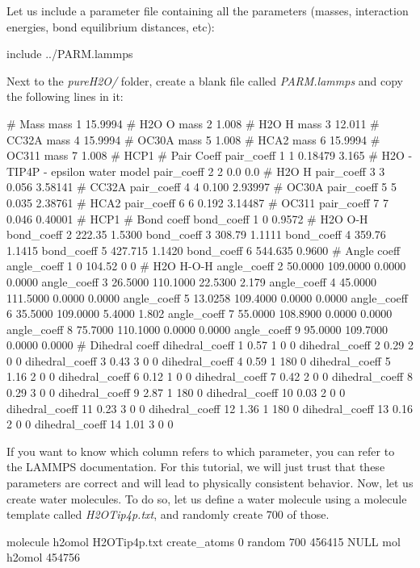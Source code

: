 Let us include a parameter file containing all the
parameters (masses, interaction energies, bond equilibrium
distances, etc):

\begin{lcverbatim}
include ../PARM.lammps
\end{lcverbatim}

\noindent Next to the \textit{pureH2O/} folder, create a blank file called
\textit{PARM.lammps} and copy the following lines in it:

\begin{lcverbatim}
# Mass
mass 1 15.9994 # H2O O
mass 2 1.008 # H2O H
mass 3 12.011 # CC32A
mass 4 15.9994 # OC30A
mass 5 1.008 # HCA2
mass 6 15.9994 # OC311
mass 7 1.008 # HCP1
# Pair Coeff
pair_coeff 1 1 0.18479 3.165 # H2O - TIP4P - epsilon water model
pair_coeff 2 2 0.0 0.0 # H2O H
pair_coeff 3 3 0.056 3.58141 # CC32A
pair_coeff 4 4 0.100 2.93997 # OC30A
pair_coeff 5 5 0.035 2.38761 # HCA2
pair_coeff 6 6 0.192 3.14487 # OC311
pair_coeff 7 7 0.046 0.40001 # HCP1
# Bond coeff
bond_coeff 1 0 0.9572 # H2O O-H
bond_coeff 2 222.35 1.5300
bond_coeff 3 308.79 1.1111
bond_coeff 4 359.76 1.1415
bond_coeff 5 427.715 1.1420
bond_coeff 6 544.635 0.9600
# Angle coeff
angle_coeff 1 0 104.52 0 0 # H2O H-O-H
angle_coeff 2 50.0000 109.0000 0.0000 0.0000
angle_coeff 3 26.5000 110.1000 22.5300 2.179   
angle_coeff 4 45.0000 111.5000 0.0000 0.0000 
angle_coeff 5 13.0258 109.4000 0.0000 0.0000
angle_coeff 6 35.5000 109.0000 5.4000 1.802
angle_coeff 7 55.0000 108.8900 0.0000 0.0000
angle_coeff 8 75.7000 110.1000 0.0000 0.0000
angle_coeff 9 95.0000 109.7000 0.0000 0.0000
# Dihedral coeff
dihedral_coeff 1 0.57 1 0 0
dihedral_coeff 2 0.29 2 0 0
dihedral_coeff 3 0.43 3 0 0
dihedral_coeff 4 0.59 1 180 0
dihedral_coeff 5 1.16 2 0 0 
dihedral_coeff 6 0.12 1 0 0 
dihedral_coeff 7 0.42 2 0 0
dihedral_coeff 8 0.29 3 0 0
dihedral_coeff 9 2.87 1 180 0
dihedral_coeff 10 0.03 2 0 0
dihedral_coeff 11 0.23 3 0 0
dihedral_coeff 12 1.36 1 180 0
dihedral_coeff 13 0.16 2 0 0
dihedral_coeff 14 1.01 3 0 0
\end{lcverbatim}

\noindent If you want to know which column refers to which
parameter, you can refer to the LAMMPS documentation. For
this tutorial, we will just trust that these parameters
are correct and will lead to physically consistent
behavior. Now, let us create water molecules. To do so, let us
define a water molecule using a molecule template called
\textit{H2OTip4p.txt}, and randomly create 700 of those.

\begin{lcverbatim}
molecule h2omol H2OTip4p.txt
create_atoms 0 random 700 456415 NULL mol h2omol 454756
\end{lcverbatim}

